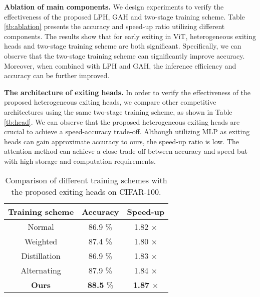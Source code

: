 \textbf{Ablation of main components.} 
We design experiments to verify the effectiveness of the proposed LPH, GAH and two-stage training scheme. 
Table \ref{tb:ablation} presents the accuracy and speed-up ratio utilizing different components. 
The results show that for early exiting in ViT, 
heterogeneous exiting heads and two-stage training scheme are both significant. 
Specifically, we can observe that the two-stage training scheme can significantly improve accuracy. 
Moreover, when combined with LPH and GAH, the inference efficiency and accuracy can be further improved. 


\textbf{The architecture of exiting heads.} 
In order to verify the effectiveness of the proposed heterogeneous exiting heads, we compare other competitive architectures using the same two-stage training scheme, as shown in Table \ref{tb:head}. 
We can observe that the proposed heterogeneous exiting heads are crucial to achieve a speed-accuracy trade-off. 
Although utilizing MLP as exiting heads can gain approximate accuracy to ours, the speed-up ratio is low. 
The attention method can achieve a close trade-off between accuracy and speed but with high storage and computation requirements. 



\begin{table}
  \renewcommand\arraystretch{0.9}
  \centering
  \setlength{\extrarowheight}{0pt}
  \addtolength{\extrarowheight}{\aboverulesep}
  \addtolength{\extrarowheight}{\belowrulesep}
  \setlength{\aboverulesep}{0pt}
  \setlength{\belowrulesep}{0pt}
  \caption{Comparison of different training schemes with the proposed exiting heads on CIFAR-100. }
  \label{tb:train}
  \vspace{-6pt}
  \begin{tabular}{ccc} 
  \toprule
  \textbf{Training scheme}                        & \textbf{Accuracy} & \textbf{Speed-up}  \\ 
  \hline
  Normal \cite{branchynet}                                         & 86.9 \%              & 1.82 $\times$                   \\
  Weighted \cite{SDN}                                       & 87.4 \%           & 1.80 $\times$                   \\
  Distillation \cite{fastbert}                                   & 86.9 \%           & 1.83 $\times$                   \\
  Alternating \cite{BERxiT}                                    & 87.9 \%           & 1.84 $\times$                  \\
  \rowcolor[rgb]{0.949,0.949,0.949} \textbf{Ours} & \textbf{88.5} \%           & \textbf{1.87} $\times$                   \\
  \bottomrule
  \end{tabular}
  \vspace{-6pt}
  \end{table}

